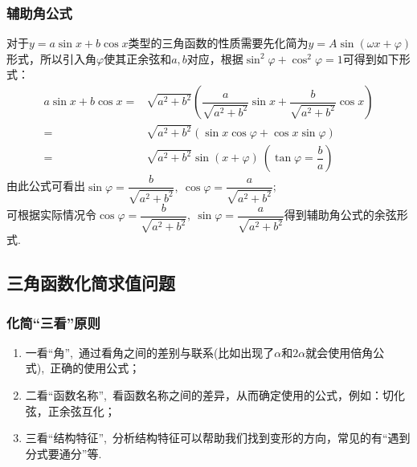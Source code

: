 \documentclass{BHCexam}
\begin{document}
\subsubsection{辅助角公式}
对于$ y=a\sin x+b\cos x $类型的三角函数的性质需要先化简为$y=A\sin\left(\omega x+\varphi\right)$形式，所以引入角$ \varphi $使其正余弦和$ a,b $对应，根据$ \sin^2\varphi+\cos^2\varphi=1 $可得到如下形式：
\begin{equation*}\begin{aligned}
a\sin x+b\cos x=&\sqrt{a^2+b^2}\left(\dfrac{a}{\sqrt{a^2+b^2}}\sin x+\dfrac{b}{\sqrt{a^2+b^2}}\cos x\right)\\
=&\sqrt{a^2+b^2}\left(\sin x\cos \varphi+\cos x\sin\varphi\right)\\
=&\sqrt{a^2+b^2}\sin\left(x+\varphi\right)~\left(\tan\varphi=\dfrac{b}{a}\right)
\end{aligned}
\end{equation*}
由此公式可看出$ \sin\varphi=\dfrac{b}{\sqrt{a^2+b^2}},~\cos\varphi=\dfrac{a}{\sqrt{a^2+b^2}} $;\\
可根据实际情况令$  \cos\varphi=\dfrac{b}{\sqrt{a^2+b^2}},~\sin\varphi=\dfrac{a}{\sqrt{a^2+b^2}} $得到辅助角公式的余弦形式.
\subsection{三角函数化简求值问题}
\subsubsection{化简“三看”原则}
\begin{enumerate}[(1)]
\item 一看“角”,~通过看角之间的差别与联系(比如出现了$ \alpha $和$ 2\alpha $就会使用倍角公式),~正确的使用公式；
\item 二看“函数名称”,~看函数名称之间的差异，从而确定使用的公式，例如：切化弦，正余弦互化；
\item 三看“结构特征”,~分析结构特征可以帮助我们找到变形的方向，常见的有“遇到分式要通分”等.
\end{enumerate}
\end{document}
